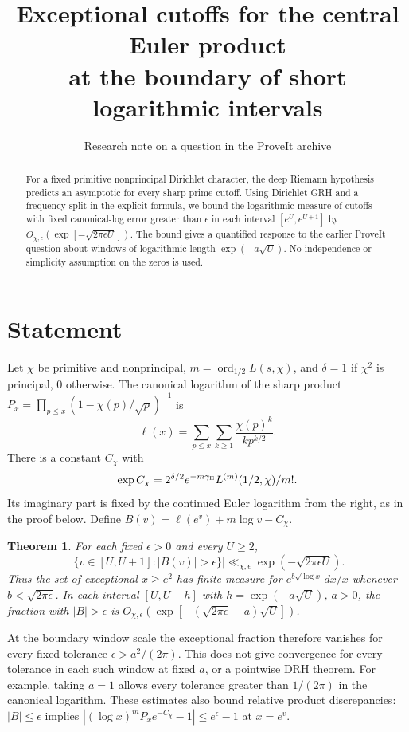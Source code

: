 \documentclass[11pt]{article}
\title{Exceptional cutoffs for the central Euler product\\at the boundary of short logarithmic intervals}
\author{Research note on a question in the ProveIt archive}\date{}
\newtheorem{theorem}{Theorem}\newtheorem{lemma}[theorem]{Lemma}
\begin{document}
\maketitle
\begin{abstract}
For a fixed primitive nonprincipal Dirichlet character, the
deep Riemann hypothesis predicts an asymptotic for every sharp prime cutoff.
Using Dirichlet GRH and a frequency split in the explicit formula, we bound
the logarithmic measure of cutoffs with fixed canonical-log error greater
than $\epsilon$ in each interval $[e^U,e^{U+1}]$ by
$O_{\chi,\epsilon}(\exp[-\sqrt{2\pi\epsilon U}])$. The bound gives a
quantified response to the earlier ProveIt question about windows of
logarithmic length $\exp(-a\sqrt U)$. No independence or simplicity
assumption on the zeros is used.
\end{abstract}
\section{Statement}
Let $\chi$ be primitive and nonprincipal, $m=\operatorname{ord}_{1/2}L(s,\chi)$,
and $\delta=1$ if $\chi^2$ is principal, $0$ otherwise. The canonical
logarithm of the sharp product $P_x=\prod_{p\le x}(1-\chi(p)/\sqrt p)^{-1}$ is
\[
 \ell(x)=\sum_{p\le x}\sum_{k\ge1}\frac{\chi(p)^k}{k p^{k/2}} .
\]
There is a constant $C_\chi$ with
\[
 \exp C_\chi=2^{\delta/2}e^{-m\gamma_{\rm E}}L^{(m)}(1/2,\chi)/m!.
\]
Its imaginary part is fixed by the continued Euler logarithm from the right,
as in the proof below. Define $B(v)=\ell(e^v)+m\log v-C_\chi$.
\begin{theorem}\label{th:main}
For each fixed $\epsilon>0$ and every $U\ge2$,
\[
 \big|\{v\in[U,U+1]:|B(v)|>\epsilon\}\big|
 \ll_{\chi,\epsilon}\exp(-\sqrt{2\pi\epsilon U}).
\]
Thus the set of exceptional $x\ge e^2$ has finite measure for
$e^{b\sqrt{\log x}}\,dx/x$ whenever $b<\sqrt{2\pi\epsilon}$. In each
interval $[U,U+h]$ with $h=\exp(-a\sqrt U)$, $a>0$, the fraction with
$|B|>\epsilon$ is
$O_{\chi,\epsilon}(\exp[-(\sqrt{2\pi\epsilon}-a)\sqrt U])$.
\end{theorem}
At the boundary window scale the exceptional fraction therefore vanishes
for every fixed tolerance $\epsilon>a^2/(2\pi)$. This does not give
convergence for every tolerance in each such window at fixed $a$, or
a pointwise DRH theorem. For example, taking $a=1$ allows every tolerance
greater than $1/(2\pi)$ in the canonical logarithm. These estimates also
bound relative product discrepancies: $|B|\le\epsilon$ implies
$|(\log x)^m P_x e^{-C_\chi}-1|\le e^\epsilon-1$ at $x=e^v$.
\end{document}
